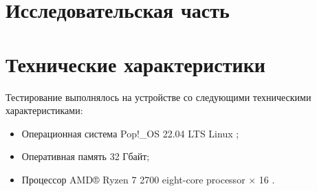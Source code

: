 \section{\large Исследовательская часть}

\section{Технические характеристики}

Тестирование выполнялось на устройстве со следующими техническими характеристиками:

\begin{itemize}
	\item Операционная система Pop!\_OS 22.04 LTS \cite{ubuntu} Linux \cite{linux};
	\item Оперативная память 32 Гбайт;
	\item Процессор AMD® Ryzen 7 2700 eight-core processor × 16 \cite{amd}.
\end{itemize}